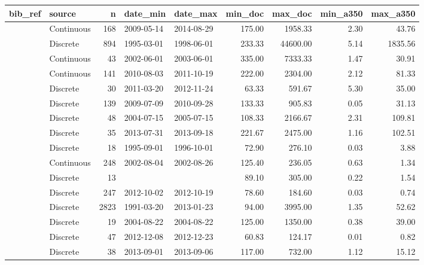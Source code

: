 \begin{table}[ht]
\centering
\begingroup\footnotesize
\begin{tabular}{llrllrrrr}
  \hline
bib\_ref & source & n & date\_min & date\_max & min\_doc & max\_doc & min\_a350 & max\_a350 \\ 
  \hline
\citet{agro} & Continuous & 168 & 2009-05-14 & 2014-08-29 & 175.00 & 1958.33 & 2.30 & 43.76 \\ 
  \citet{Aiken2005} & Discrete & 894 & 1995-03-01 & 1998-06-01 & 233.33 & 44600.00 & 5.14 & 1835.56 \\ 
  \citet{Anderson2007} & Continuous &  43 & 2002-06-01 & 2003-06-01 & 335.00 & 7333.33 & 1.47 & 30.91 \\ 
  \citet{Asmala2014} & Continuous & 141 & 2010-08-03 & 2011-10-19 & 222.00 & 2304.00 & 2.12 & 81.33 \\ 
  \citet{Bouillon2014} & Discrete &  30 & 2011-03-20 & 2012-11-24 & 63.33 & 591.67 & 5.30 & 35.00 \\ 
  \citet{Braun2015} & Discrete & 139 & 2009-07-09 & 2010-09-28 & 133.33 & 905.83 & 0.05 & 31.13 \\ 
  \citet{Breton2009} & Discrete &  48 & 2004-07-15 & 2005-07-15 & 108.33 & 2166.67 & 2.31 & 109.81 \\ 
  \citet{Brezonik2015} & Discrete &  35 & 2013-07-31 & 2013-09-18 & 221.67 & 2475.00 & 1.16 & 102.51 \\ 
  \citet{Castillo1999} & Discrete &  18 & 1995-09-01 & 1996-10-01 & 72.90 & 276.10 & 0.03 & 3.88 \\ 
  \citet{Conan2007} & Continuous & 248 & 2002-08-04 & 2002-08-26 & 125.40 & 236.05 & 0.63 & 1.34 \\ 
  \citet{Delcastillo2000} & Discrete &  13 &  &  & 89.10 & 305.00 & 0.22 & 1.54 \\ 
  \citet{Engel2015} & Discrete & 247 & 2012-10-02 & 2012-10-19 & 78.60 & 184.60 & 0.03 & 0.74 \\ 
  \citet{finish_rivers} & Discrete & 2823 & 1991-03-20 & 2013-01-23 & 94.00 & 3995.00 & 1.35 & 52.62 \\ 
  \citet{Forsstrom2015} & Discrete &  19 & 2004-08-22 & 2004-08-22 & 125.00 & 1350.00 & 0.38 & 39.00 \\ 
  \citet{Galgani2016} & Discrete &  47 & 2012-12-08 & 2012-12-23 & 60.83 & 124.17 & 0.01 & 0.82 \\ 
  \citet{Goncalves2015} & Discrete &  38 & 2013-09-01 & 2013-09-06 & 117.00 & 732.00 & 1.12 & 15.12 \\ 

\end{tabular}
\end{table}
